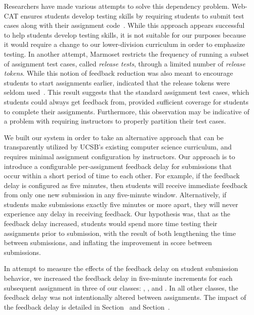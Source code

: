 Researchers have made various attempts to solve this dependency
problem. Web-CAT ensures students develop testing skills by requiring students
to submit test cases along with their assignment
code~\cite{Edwards:2003:RCS:949344.949390}. While this approach appears
successful to help students develop testing skills, it is not suitable for our
purposes because it would require a change to our lower-division curriculum in
order to emphasize testing. In another attempt, Marmoset restricts the
frequency of running a subset of assignment test cases, called \emph{release
  tests}, through a limited number of \emph{release tokens}. While this notion
of feedback reduction was also meant to encourage students to start assignments
earlier, \spacco{} indicated that the release tokens were seldom
used~\cite{Spacco:2013:TIP:2462476.2465594}. This result suggests that the
standard assignment test cases, which students could always get feedback from,
provided sufficient coverage for students to complete their
assignments. Furthermore, this observation may be indicative of a problem with
requiring instructors to properly partition their test cases.

We built our system in order to take an alternative approach that can be
transparently utilized by UCSB's existing computer science curriculum, and
requires minimal assignment configuration by instructors. Our approach is to
introduce a configurable per-assignment feedback delay for submissions that
occur within a short period of time to each other. For example, if the feedback
delay is configured as five minutes, then students will receive immediate
feedback from only one new submission in any five-minute window. Alternatively,
if students make submissions exactly five minutes or more apart, they will
never experience any delay in receiving feedback. Our hypothesis was, that as
the feedback delay increased, students would spend more time testing their
assignments prior to submission, with the result of both lengthening the time
between submissions, and inflating the improvement in score between
submissions.

In attempt to measure the effects of the feedback delay on student submission
behavior, we increased the feedback delay in five-minute increments for each
subsequent assignment in three of our classes: , , and
. In all other classes, the feedback delay was not intentionally
altered between assignments. The impact of the feedback delay is detailed in
Section~ and Section~.


